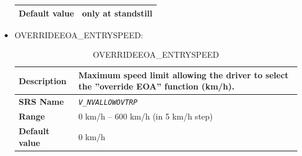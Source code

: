 \documentclass{template/openetcs}
\begin{document}
\begin{itemize}
\begin{longtable}{|l|l|}
				\hline
										
					\begin{minipage}[t]{0.22\linewidth} \textbf{Default value}	\end{minipage} 
				&	\begin{minipage}[t]{0.78\linewidth} only at standstill \end{minipage} \\
				
				\hline
				
			\end{longtable}
		\item OVERRIDEEOA\_ENTRYSPEED:
		
			\begin{longtable}{|l|l|}
				\caption{OVERRIDEEOA\_ENTRYSPEED}\\ 																	
				\hline
				
					\begin{minipage}[t]{0.22\linewidth} \textbf{Description}	\end{minipage} 
				&	\begin{minipage}[t]{0.78\linewidth} Maximum speed limit allowing the driver to select the ”override EOA” function (km/h). \end{minipage} \\
				
				\hline
				
					\begin{minipage}[t]{0.22\linewidth} \textbf{SRS Name}	\end{minipage} 
				&	\begin{minipage}[t]{0.78\linewidth} \emph{\texttt{V\_NVALLOWOVTRP}} \end{minipage} \\
				
				\hline
																																
					\begin{minipage}[t]{0.22\linewidth} \textbf{Range}	\end{minipage} 
				&	\begin{minipage}[t]{0.78\linewidth} 0 km/h – 600 km/h (in 5 km/h step) \end{minipage} \\
								
				\hline
										
					\begin{minipage}[t]{0.22\linewidth} \textbf{Default value}	\end{minipage} 
				&	\begin{minipage}[t]{0.78\linewidth} 0 km/h \end{minipage} \\
				

\end{longtable}
\end{itemize}
\end{document}
